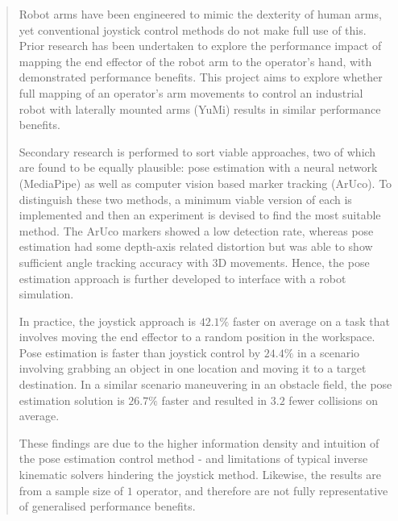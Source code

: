 \uomtoc


\begin{abstract} %
  Robot arms have been engineered to mimic the dexterity of human arms, yet conventional joystick control methods do not make full use of this.
  Prior research has been undertaken to explore the performance impact of mapping the end effector of the robot arm to the operator's hand, with demonstrated performance benefits.
  This project aims to explore whether full mapping of an operator's arm movements to control an industrial robot with laterally mounted arms (YuMi) results in similar performance benefits.
  
  Secondary research is performed to sort viable approaches, two of which are found to be equally plausible: pose estimation with a neural network (MediaPipe) as well as computer vision based marker tracking (ArUco). 
  To distinguish these two methods, a minimum viable version of each is implemented and then an experiment is devised to find the most suitable method.
  The ArUco markers showed a low detection rate, whereas pose estimation had some depth-axis related distortion but was able to show sufficient angle tracking accuracy with 3D movements.
  Hence, the pose estimation approach is further developed to interface with a robot simulation.

  In practice, the joystick approach is \(42.1 \%\) faster on average on a task that involves moving the end effector to a random position in the workspace.
  Pose estimation is faster than joystick control by \(24.4 \%\) in a scenario involving grabbing an object in one location and moving it to a target destination.
  In a similar scenario maneuvering in an obstacle field, the pose estimation solution is \(26.7 \%\) faster and resulted in \(3.2\) fewer collisions on average.
  
  These findings are due to the higher information density and intuition of the pose estimation control method - and limitations of typical inverse kinematic solvers hindering the joystick method.
  Likewise, the results are from a sample size of \(1\) operator, and therefore are not fully representative of generalised performance benefits.
\end{abstract}%
\clearpage



